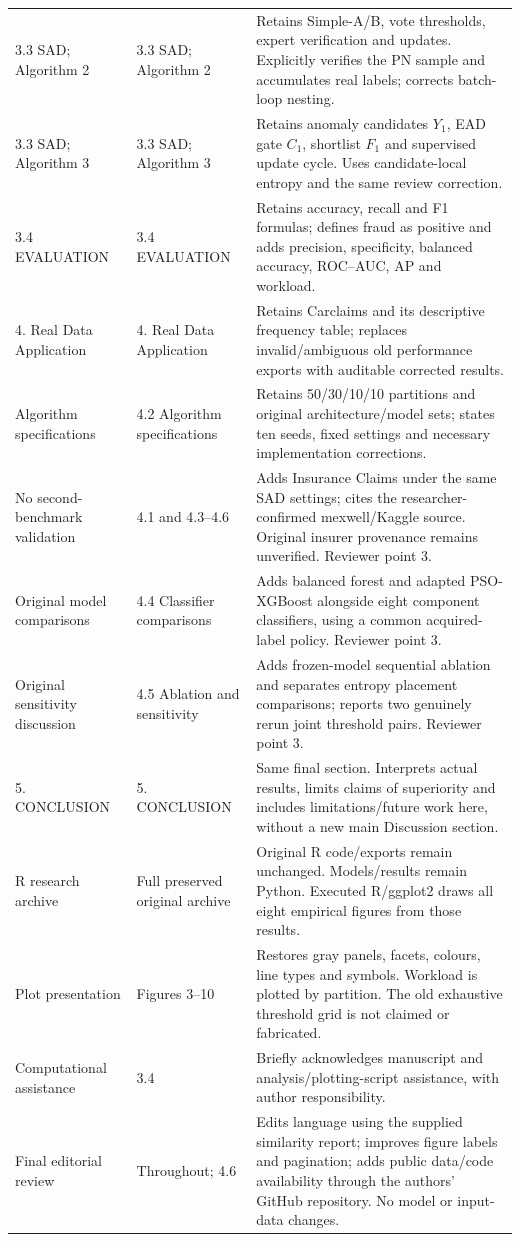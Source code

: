 \documentclass[11pt,a4paper]{article}
\begin{document}
\begin{longtable}{p{3.3cm}p{3.7cm}p{7.1cm}}
3.3 SAD; Algorithm 2 & 3.3 SAD; Algorithm 2 & Retains Simple-A/B, vote thresholds, expert verification and updates. Explicitly verifies the PN sample and accumulates real labels; corrects batch-loop nesting.\\
3.3 SAD; Algorithm 3 & 3.3 SAD; Algorithm 3 & Retains anomaly candidates $Y_1$, EAD gate $C_1$, shortlist $F_1$ and supervised update cycle. Uses candidate-local entropy and the same review correction.\\
3.4 EVALUATION & 3.4 EVALUATION & Retains accuracy, recall and F1 formulas; defines fraud as positive and adds precision, specificity, balanced accuracy, ROC--AUC, AP and workload.\\
4. Real Data Application & 4. Real Data Application & Retains Carclaims and its descriptive frequency table; replaces invalid/ambiguous old performance exports with auditable corrected results.\\
Algorithm specifications & 4.2 Algorithm specifications & Retains 50/30/10/10 partitions and original architecture/model sets; states ten seeds, fixed settings and necessary implementation corrections.\\
No second-benchmark validation & 4.1 and 4.3--4.6 & Adds Insurance Claims under the same SAD settings; cites the researcher-confirmed mexwell/Kaggle source. Original insurer provenance remains unverified. Reviewer point 3.\\
Original model comparisons & 4.4 Classifier comparisons & Adds balanced forest and adapted PSO-XGBoost alongside eight component classifiers, using a common acquired-label policy. Reviewer point 3.\\
Original sensitivity discussion & 4.5 Ablation and sensitivity & Adds frozen-model sequential ablation and separates entropy placement comparisons; reports two genuinely rerun joint threshold pairs. Reviewer point 3.\\
5. CONCLUSION & 5. CONCLUSION & Same final section. Interprets actual results, limits claims of superiority and includes limitations/future work here, without a new main Discussion section.\\
R research archive & Full preserved original archive & Original R code/exports remain unchanged. Models/results remain Python. Executed R/ggplot2 draws all eight empirical figures from those results.\\
Plot presentation & Figures 3--10 & Restores gray panels, facets, colours, line types and symbols. Workload is plotted by partition. The old exhaustive threshold grid is not claimed or fabricated.\\
Computational assistance & 3.4 & Briefly acknowledges manuscript and analysis/plotting-script assistance, with author responsibility.\\
Final editorial review & Throughout; 4.6 & Edits language using the supplied similarity report; improves figure labels and pagination; adds public data/code availability through the authors' GitHub repository. No model or input-data changes.\\
\bottomrule\end{longtable}
\normalsize
\end{document}
